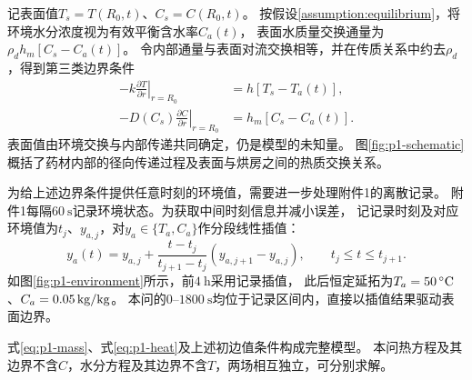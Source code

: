 记表面值$T_s=T(R_0,t)$、$C_s=C(R_0,t)$。
按假设\ref{assumption:equilibrium}，将环境水分浓度视为有效平衡含水率$C_a(t)$，
表面水质量交换通量为$\rho_dh_m[C_s-C_a(t)]$。
令内部通量与表面对流交换相等，并在传质关系中约去$\rho_d$，得到第三类边界条件
\begin{align}
  -k\left.\frac{\partial T}{\partial r}\right|_{r=R_0}
    &=h[T_s-T_a(t)],\label{eq:p1-boundary-heat}\\
  -D(C_s)\left.\frac{\partial C}{\partial r}\right|_{r=R_0}
    &=h_m[C_s-C_a(t)].\label{eq:p1-boundary-mass}
\end{align}
表面值由环境交换与内部传递共同确定，仍是模型的未知量。
图\ref{fig:p1-schematic}概括了药材内部的径向传递过程及表面与烘房之间的热质交换关系。


为给上述边界条件提供任意时刻的环境值，需要进一步处理附件1的离散记录。
附件1每隔$60\ \mathrm{s}$记录环境状态。为获取中间时刻信息并减小误差，
记记录时刻及对应环境值为$t_j$、$y_{a,j}$，对$y_a\in\{T_a,C_a\}$作分段线性插值\cite{num}：
\begin{equation}
  y_a(t)=y_{a,j}
  +\frac{t-t_j}{t_{j+1}-t_j}(y_{a,j+1}-y_{a,j}),
  \qquad t_j\le t\le t_{j+1}.
  \label{eq:p1-environment}
\end{equation}
如图\ref{fig:p1-environment}所示，前$4\ \mathrm{h}$采用记录插值，
此后恒定延拓为$T_a=50\,{}^{\circ}\mathrm{C}$、$C_a=0.05\,\mathrm{kg/kg}$。
本问的$0$--$1800\ \mathrm{s}$均位于记录区间内，直接以插值结果驱动表面边界。


式\eqref{eq:p1-mass}、式\eqref{eq:p1-heat}及上述初边值条件构成完整模型。
本问热方程及其边界不含$C$，水分方程及其边界不含$T$，两场相互独立，可分别求解。
